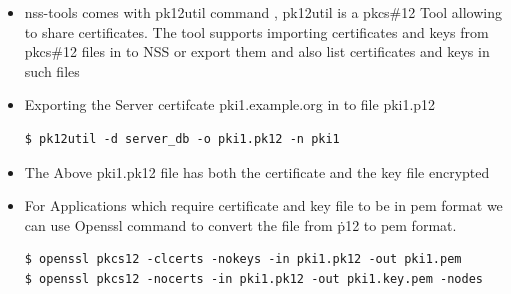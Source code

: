 \documentclass[a4paper]{article}
\begin{document}
\begin{enumerate}[label*=\arabic*.]
\begin{itemize}
            \item nss-tools comes with pk12util command , pk12util is a pkcs\#12 Tool allowing to share certificates. The tool supports importing certificates and keys from pkcs\#12 files in to NSS or export them and also list certificates and keys in such files

            \item Exporting the Server certifcate pki1.example.org in to file pki1.p12 
                \begin{lstlisting}[style=BashInputStyle]
$ pk12util -d server_db -o pki1.pk12 -n pki1
                \end{lstlisting}

            \item The Above pki1.pk12 file has both the certificate and the key file encrypted

            \item For Applications which require certificate and key file to be in pem format we can use Openssl command to convert the file from \.p12 to pem format.
                \begin{lstlisting}[style=BashInputStyle]
$ openssl pkcs12 -clcerts -nokeys -in pki1.pk12 -out pki1.pem
$ openssl pkcs12 -nocerts -in pki1.pk12 -out pki1.key.pem -nodes
                \end{lstlisting}
        \end{itemize}
\end{enumerate}
\end{document}
